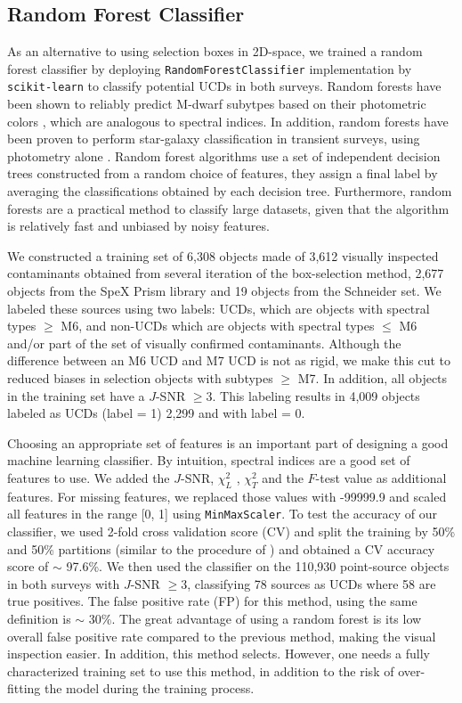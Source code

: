 \documentclass[manuscript]{aastex63}
\begin{document}
\subsection{Random Forest Classifier}

As an alternative to using selection boxes in 2D-space, we trained a random forest classifier by deploying \texttt{RandomForestClassifier} implementation by \texttt{scikit-learn} \citep{2012arXiv1201.0490P} to classify potential UCDs in both surveys. Random forests have been shown to reliably predict M-dwarf subytpes based on their photometric colors \citep{2019arXiv190505900H}, which are analogous to spectral indices. In addition, random forests have been proven to perform star-galaxy classification in transient surveys, using photometry alone \citep{2017AJ....153...73M}. Random forest algorithms use a set of independent decision trees constructed from a random choice of features, they assign a final label by averaging the classifications obtained by each decision tree. Furthermore, random forests are a practical method to classify large datasets, given that the algorithm is relatively fast and unbiased by noisy features.

 We constructed a training set of 6,308 objects made of 3,612 visually inspected contaminants obtained from several iteration of the box-selection method, 2,677 objects from the SpeX Prism library and 19 objects from the Schneider set. We labeled these sources using two labels: UCDs, which are objects with spectral types $\geq$ M6, and non-UCDs which are objects with spectral types $\leq$ M6 and/or part of the set of visually confirmed contaminants. Although the difference between an M6 UCD and M7 UCD is not as rigid, we make this cut to reduced biases in selection objects with subtypes $\geq$ M7. In addition, all objects in the training set have a $J$-SNR $\geq 3$. This labeling results in 4,009 objects labeled as UCDs (label = 1) 2,299 and with label = 0.
 
Choosing an appropriate set of features is an important part of designing a good machine learning classifier. By intuition, spectral indices are a good set of features to use. We added the $J$-SNR, $\chi^2 _L$ , $\chi^2 _T$ and the $F$-test value as additional features. For missing features, we replaced those values with -99999.9 and scaled all features in the range [0, 1] using \texttt{MinMaxScaler}. To test the accuracy of our classifier, we used 2-fold cross validation score (CV) and split the training by 50\% and 50\% partitions (similar to the procedure of \citealt{2017AJ....153...73M}) and obtained a CV accuracy score of $\sim$ 97.6\%. We then used the classifier on the 110,930 point-source objects in both surveys with $J$-SNR $\geq3$, classifying 78 sources as UCDs where 58 are true positives. The false positive rate (FP) for this method, using the same definition is $\sim$ 30\%. The great advantage of using a random forest is its low overall false positive rate compared to the previous method, making the visual inspection easier. In addition, this method selects. However, one needs a fully characterized training set to use this method, in addition to the risk of over-fitting the model during the training process.
\end{document}
